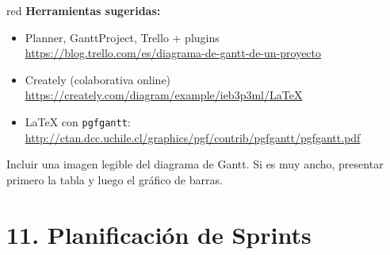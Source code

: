 \documentclass[
11pt, %
]{charter}
\begin{document}
\begin{consigna}{red}
\textbf{Herramientas sugeridas:}
\begin{itemize}
  \item Planner, GanttProject, Trello + plugins\\
  \url{https://blog.trello.com/es/diagrama-de-gantt-de-un-proyecto}
  \item Creately (colaborativa online)\\
  \url{https://creately.com/diagram/example/ieb3p3ml/LaTeX}
  \item LaTeX con \texttt{pgfgantt}:\\
  \url{http://ctan.dcc.uchile.cl/graphics/pgf/contrib/pgfgantt/pgfgantt.pdf}
\end{itemize}

Incluir una imagen legible del diagrama de Gantt. Si es muy ancho, presentar primero la tabla y luego el gráfico de barras.

\end{consigna} %


\section{11. Planificación de Sprints}
\end{document}
